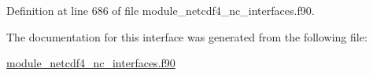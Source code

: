 Definition at line 686 of file module\+\_\+netcdf4\+\_\+nc\+\_\+interfaces.\+f90.



The documentation for this interface was generated from the following file\+:\begin{DoxyCompactItemize}
\item 
\hyperlink{module__netcdf4__nc__interfaces_8f90}{module\+\_\+netcdf4\+\_\+nc\+\_\+interfaces.\+f90}\end{DoxyCompactItemize}

